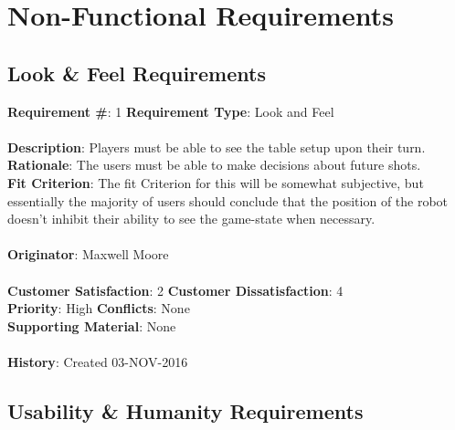 \documentclass[titlepage]{article}
\begin{document}
 




\section{Non-Functional Requirements}
 \subsection{Look \& Feel Requirements}

\begin{framed}
	\noindent\textbf{Requirement \#}: 1 \hfill \textbf{Requirement Type}: Look and Feel \hfill\\\\
	\noindent\textbf{Description}: Players must be able to see the table setup upon their turn.\\
	\textbf{Rationale}: The users must be able to make decisions about future shots.\\
	\textbf{Fit Criterion}: The fit Criterion for this will be somewhat subjective, but essentially the majority of users should conclude that the position of the robot doesn't inhibit their ability to see the game-state when necessary.\\\\
	\textbf{Originator}: Maxwell Moore\\\\
	\noindent\textbf{Customer Satisfaction}: 2 \hfill 	\textbf{Customer Dissatisfaction}: 4 \hfill\\
	\textbf{Priority}: High \hfill \textbf{Conflicts}: None \hfill\\
	\textbf{Supporting Material}: None\\\\
	\noindent\textbf{History}: Created 03-NOV-2016
\end{framed}


 
 \subsection{Usability \& Humanity Requirements}
\end{document}

